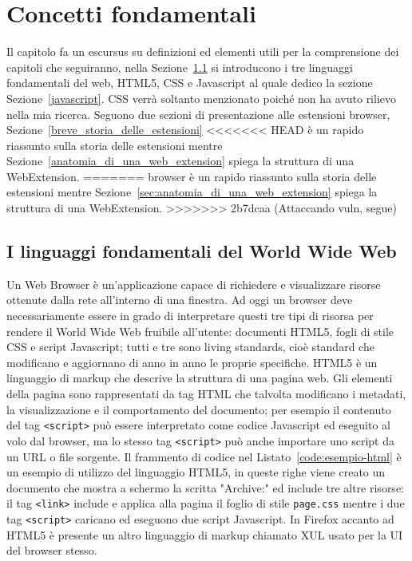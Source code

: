 \documentclass{sapthesis}
\newcommand{\code}[1]{\texttt{#1}}
\newcommand{\Sezione}[1]{Sezione~\ref{#1}}
\newcommand{\www}{World Wide Web }
\begin{document}
\chapter{Concetti fondamentali}
    Il capitolo fa un escursus su definizioni ed elementi utili per la comprensione dei capitoli che seguiranno,
    nella \Sezione{I-linguaggi-fondamentali-del-www} si introducono i tre linguaggi fondamentali del web, HTML5,
    CSS e Javascript al quale dedico la sezione \Sezione{javascript}. CSS verrà soltanto menzionato poiché non ha
    avuto rilievo nella mia ricerca. Seguono due sezioni di presentazione alle estensioni browser, \Sezione{breve_storia_delle_estensioni}
<<<<<<< HEAD
      è un rapido riassunto sulla storia delle estensioni 
    mentre \Sezione{anatomia_di_una_web_extension} spiega la struttura di una WebExtension.
=======
     browser  è un rapido riassunto sulla storia delle estensioni 
    mentre \Sezione{sec:anatomia_di_una_web_extension} spiega la struttura di una WebExtension.
>>>>>>> 2b7dcaa (Attaccando vuln, segue)


    \section{I linguaggi fondamentali del \www}
    \label{I-linguaggi-fondamentali-del-www}
        Un Web Browser è un'applicazione capace di richiedere e visualizzare risorse ottenute dalla rete
        all'interno di una finestra.
        Ad oggi un browser deve necessariamente essere in grado di interpretare questi tre tipi di risorsa 
        per rendere il \www fruibile all'utente: documenti HTML5, fogli di stile CSS e script Javascript;
        tutti e tre sono living standards, cioè standard che modificano e aggiornano di anno in anno le
        proprie specifiche.
        HTML5 è un linguaggio di markup che descrive la struttura di una pagina web. Gli elementi della 
        pagina sono rappresentati da tag HTML che talvolta modificano i metadati, la visualizzazione e 
        il comportamento del documento; per esempio il contenuto del tag \code{<script>} può essere interpretato 
        come codice Javascript ed eseguito al volo dal browser, ma lo stesso tag \code{<script>} può anche importare
        uno script da un URL o file sorgente.
        Il frammento di codice nel Listato~\ref{code:esempio-html} è un esempio di utilizzo del linguaggio HTML5, in queste
        righe viene creato un documento che mostra a schermo la scritta "Archive:" ed include tre altre risorse:
        il tag \code{<link>} include e applica alla pagina il foglio di stile \code{page.css} mentre i due tag
        \code{<script>} caricano ed eseguono due script Javascript.
        In Firefox accanto ad HTML5 è presente un altro linguaggio di markup 
        chiamato XUL usato per la UI del browser stesso.
\end{document}
